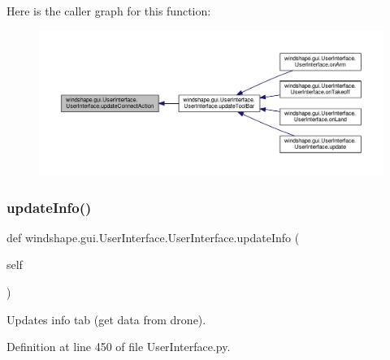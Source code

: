 Here is the caller graph for this function\+:\nopagebreak
\begin{figure}[H]
\begin{center}
\leavevmode
\includegraphics[width=350pt]{classwindshape_1_1gui_1_1_user_interface_1_1_user_interface_a18f90d2c6c5635130e9181facda026c0_icgraph}
\end{center}
\end{figure}
\mbox{\label{classwindshape_1_1gui_1_1_user_interface_1_1_user_interface_a286ad19e8d76c02314769ce90e47513e}} 
\subsubsection{\texorpdfstring{update\+Info()}{updateInfo()}}
{\footnotesize\ttfamily def windshape.\+gui.\+User\+Interface.\+User\+Interface.\+update\+Info (\begin{DoxyParamCaption}\item[{}]{self }\end{DoxyParamCaption})}

\begin{DoxyVerb}Updates info tab (get data from drone).\end{DoxyVerb}
 

Definition at line 450 of file User\+Interface.\+py.

